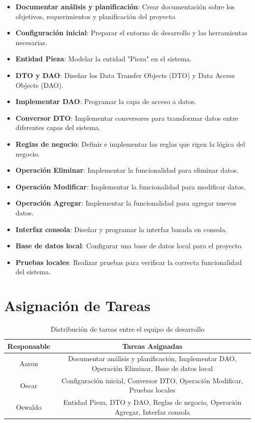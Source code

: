 \begin{itemize}
    \item \textbf{Documentar análisis y planificación}: Crear documentación sobre los objetivos, requerimientos y planificación del proyecto.
    \item \textbf{Configuración inicial}: Preparar el entorno de desarrollo y las herramientas necesarias.
    \item \textbf{Entidad Pieza}: Modelar la entidad "Pieza" en el sistema.
    \item \textbf{DTO y DAO}: Diseñar los Data Transfer Objects (DTO) y Data Access Objects (DAO).
    \item \textbf{Implementar DAO}: Programar la capa de acceso a datos.
    \item \textbf{Conversor DTO}: Implementar conversores para transformar datos entre diferentes capas del sistema.
    \item \textbf{Reglas de negocio}: Definir e implementar las reglas que rigen la lógica del negocio.
    \item \textbf{Operación Eliminar}: Implementar la funcionalidad para eliminar datos.
    \item \textbf{Operación Modificar}: Implementar la funcionalidad para modificar datos.
    \item \textbf{Operación Agregar}: Implementar la funcionalidad para agregar nuevos datos.
    \item \textbf{Interfaz consola}: Diseñar y programar la interfaz basada en consola.
    \item \textbf{Base de datos local}: Configurar una base de datos local para el proyecto.
    \item \textbf{Pruebas locales}: Realizar pruebas para verificar la correcta funcionalidad del sistema.
\end{itemize}

\section{Asignación de Tareas}

\begin{table}[h]
    \centering
    \begin{tabular}{|c|c|}
        \hline
        \textbf{Responsable} & \textbf{Tareas Asignadas} \\
        \hline
        Aaron & Documentar análisis y planificación, Implementar DAO, Operación Eliminar, Base de datos local \\
        \hline
        Oscar & Configuración inicial, Conversor DTO, Operación Modificar, Pruebas locales \\
        \hline
        Oswaldo & Entidad Pieza, DTO y DAO, Reglas de negocio, Operación Agregar, Interfaz consola \\
        \hline
    \end{tabular}
    \caption{Distribución de tareas entre el equipo de desarrollo}
\end{table}


